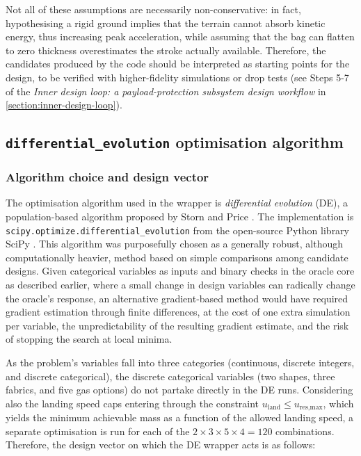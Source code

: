 Not all of these assumptions are necessarily non-conservative: in fact, hypothesising a rigid ground implies that the terrain cannot absorb kinetic energy, thus increasing peak acceleration, while assuming that the bag can flatten to zero thickness overestimates the stroke actually available. Therefore, the candidates produced by the code should be interpreted as starting points for the design, to be verified with higher-fidelity simulations or drop tests (see Steps 5-7 of the \textit{Inner design loop: a payload-protection subsystem design workflow} in \cref{section:inner-design-loop}).



\subsection{\texttt{differential\_evolution} optimisation algorithm}\label{sec:optimisation-algorithm-wrapper}
\subsubsection{Algorithm choice and design vector}
The optimisation algorithm used in the wrapper is \textit{differential evolution} (DE), a population-based algorithm proposed by Storn and Price \cite{Storn1997}. The implementation is \texttt{scipy.optimize.differential\_evolution} from the open-source Python library SciPy \cite{SciPyDE_docs}. This algorithm was purposefully chosen as a generally robust, although computationally heavier, method based on simple comparisons among candidate designs. Given categorical variables as inputs and binary checks in the oracle core as described earlier, where a small change in design variables can radically change the oracle's response, an alternative gradient-based method would have required gradient estimation through finite differences, at the cost of one extra simulation per variable, the unpredictability of the resulting gradient estimate, and the risk of stopping the search at local minima.

As the problem's variables fall into three categories (continuous, discrete integers, and discrete categorical), the discrete categorical variables (two shapes, three fabrics, and five gas options) do not partake directly in the DE runs. Considering also the landing speed caps entering through the constraint $u_\text{land} \le u_\text{res,max}$, which yields the minimum achievable mass as a function of the allowed landing speed, a separate optimisation is run for each of the $2 \times 3 \times 5 \times 4 = 120$ combinations. Therefore, the design vector on which the DE wrapper acts is as follows:

